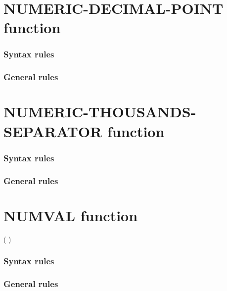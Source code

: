 \section{NUMERIC-DECIMAL-POINT function}

\begin{syntax}[\gnucobolcolour]
   
\end{syntax}

\subsubsection{Syntax rules}

\subsubsection{General rules}

\section{NUMERIC-THOUSANDS-SEPARATOR function}

\begin{syntax}[\gnucobolcolour]
   
\end{syntax}

\subsubsection{Syntax rules}

\subsubsection{General rules}

\section{NUMVAL function}

\begin{syntax}
    ( \argument )
\end{syntax}

\subsubsection{Syntax rules}

\subsubsection{General rules}

